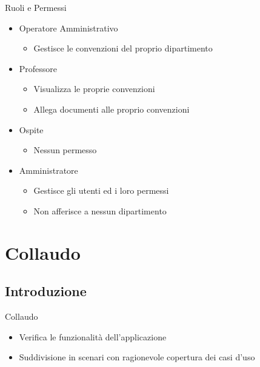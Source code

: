 \begin{frame}{Ruoli e Permessi}
\begin{itemize}
	
\item Operatore Amministrativo
	\begin{itemize}
	\item Gestisce le convenzioni del proprio dipartimento
	\end{itemize}

\vspace{0.8em}
\item Professore
	\begin{itemize}
	\item Visualizza le proprie convenzioni
	\item Allega documenti alle proprio convenzioni
	\end{itemize}

\vspace{0.8em}
\item Ospite
	\begin{itemize}
	\item Nessun permesso
	\end{itemize}

\vspace{0.8em}
\item Amministratore
	\begin{itemize}
	\item Gestisce gli utenti ed i loro permessi
	\item Non afferisce a nessun dipartimento
	\end{itemize}
\end{itemize}
\end{frame}

\section{Collaudo}
\subsection{Introduzione}
\begin{frame}{Collaudo}
\begin{itemize}
\item Verifica le funzionalità dell'applicazione
\vspace{0.8em}
\item Suddivisione in scenari con ragionevole copertura\newline
dei casi d'uso
\end{itemize}

\end{frame}

